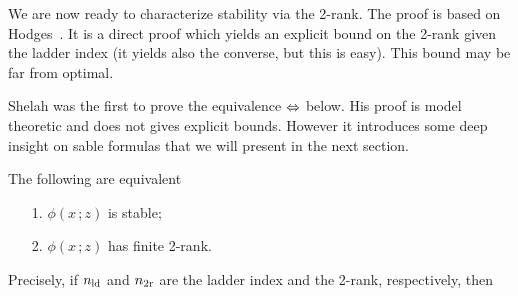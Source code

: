 \documentclass[scombinatorics.tex]{subfiles}
\begin{document}
We are now ready to characterize stability via the 2-rank.
The proof is based on Hodges~\cite{hodges}.
It is a direct proof which yields an explicit bound on the 2-rank given the ladder index (it yields also the converse, but this is easy).
This bound may be far from optimal.

Shelah was the first to prove the equivalence $\Leftrightarrow$ below.
His proof is model theoretic and does not gives explicit bounds.
However it introduces some deep insight on sable formulas that we will present in the next section.

\begin{theorem}\label{thm_hodges}
  The following are equivalent
  \begin{itemize}
    \item[1.] $\phi(x\,;z)$ is stable;
    \item[2.] $\phi(x\,;z)$ has finite 2-rank.
  \end{itemize}
  Precisely, if $n_{\rm ld}$ and $n_{\rm 2r}$ are the ladder index and the 2-rank, respectively, then 
  

\end{theorem}
\end{document}
